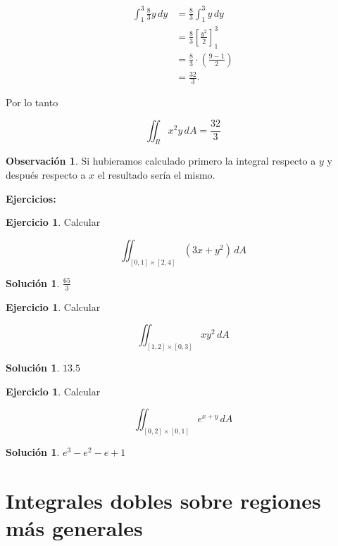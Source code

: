 \documentclass{article}
\theoremstyle{plain}
\theoremstyle{definition}
\newtheorem{ejer}[thm]{Ejercicio}
\newtheorem{sol}[thm]{Solución}
\newtheorem{rmk}[thm]{Observación}
\begin{document}
\begin{align*}
    \int_1^3 \frac{8}{3} y \, dy &= \frac{8}{3} \int_1^3 y \, dy \\
    &= \frac{8}{3} \left[ \frac{y^2}{2} \right]_1^3 \\
    &= \frac{8}{3} \cdot \left( \frac{9 - 1}{2} \right) \\
    &= \frac{32}{3}.
\end{align*}

Por lo tanto

\[
\boxed{\iint_R x^2 y \, dA = \frac{32}{3}}
\]

\begin{rmk}Si hubieramos calculado primero la integral respecto a $y$ y después respecto a $x$ el resultado sería el mismo. \\
\end{rmk}


\textbf{Ejercicios: } \\



\begin{ejer}Calcular
\end{ejer}
\[
\iint_{[0,1] \times [2,4]} (3x + y^2) \, dA
\]

\begin{sol}$\displaystyle \frac{65}{3}$
\end{sol}


\vspace{1em}

\begin{ejer}Calcular
\end{ejer}
\[
\iint_{[1,2] \times [0,3]} x y^2 \, dA
\]

\begin{sol}$\displaystyle 13.5$
\end{sol}


\vspace{1em}

\begin{ejer}Calcular
\end{ejer}
\[
\iint_{[0,2] \times [0,1]} e^{x+y} \, dA
\]

\begin{sol}$e^3 - e^2 - e + 1$
\end{sol}

\newpage


\section{Integrales dobles sobre regiones más generales}
\end{document}
